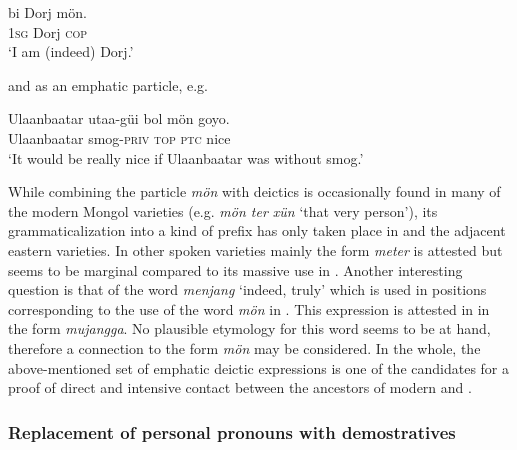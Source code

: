 \documentclass[output=paper,colorlinks,citecolor=brown]{langscibook}
\begin{document}
\ea
    \label{example9.17}
    \gll bi Dorj mön.\\
    1\textsc{sg} Dorj \textsc{cop}\\
    \glt `I am (indeed) Dorj.'\\
    \z

\noindent and as an emphatic particle, e.g.

\ea
    \label{example9.18}
    \gll Ulaanbaatar 	utaa-güi 	bol 	mön 	goyo.\\
    Ulaanbaatar 	smog-\textsc{priv} 	\textsc{top} 	\textsc{ptc} 	nice\\
    \glt `It would be really nice if Ulaanbaatar was without smog.'\\
    \z

While combining the particle \textit{mön} with deictics is occasionally found in many of the modern Mongol varieties (e.g.  \textit{mön ter xün} ‘that very person’), its grammaticalization into a kind of prefix has only taken place in  and the adjacent eastern  varieties. In other spoken  varieties mainly the form \textit{meter} is attested \citep[155]{WangQingfeng2005Z} but seems to be marginal compared to its massive use in . Another interesting question is that of the  word \textit{menjang} ‘indeed, truly’ which is used in positions corresponding to the use of the word \textit{mön} in . This expression is attested in  in the form \textit{mujangga}. No plausible  etymology for this word seems to be at hand, therefore a connection to the  form \textit{mön} may be considered. In the whole, the above-mentioned  set of emphatic deictic expressions is one of the candidates for a proof of direct and intensive contact between the ancestors of modern  and .

\subsubsection{Replacement of personal pronouns with demostratives}
\end{document}
